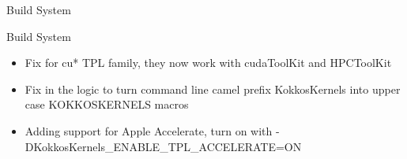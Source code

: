 \begin{frame}[fragile]

  {\Huge Build System}

  \vspace{10pt}

\end{frame}

\begin{frame}[fragile]{Build System}
  \begin{itemize}
  \item Fix for cu* TPL family, they now work with cudaToolKit and HPCToolKit
  \item Fix in the logic to turn command line camel prefix KokkosKernels into upper case KOKKOSKERNELS macros
  \item Adding support for Apple Accelerate, turn on with {\ttfamily -DKokkosKernels\_ENABLE\_TPL\_ACCELERATE=ON}
  \end{itemize}
\end{frame}

